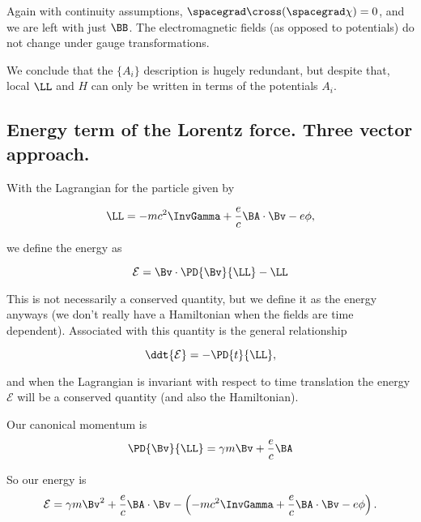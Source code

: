 Again with continuity assumptions, $\spacegrad \cross (\spacegrad \chi) = 0$, and we are left with just $\BB$.  The electromagnetic fields (as opposed to potentials) do not change under gauge transformations.

We conclude that the $\{A_i\}$ description is hugely redundant, but despite that, local $\LL$ and $H$ can only be written in terms of the potentials $A_i$.

\subsection{Energy term of the Lorentz force.  Three vector approach.}

With the Lagrangian for the particle given by

\begin{equation}\label{eqn:relativisticElectrodynamicsL10:130}
\LL = - mc^2 \InvGamma + \frac{e}{c} \BA \cdot \Bv - e \phi,
\end{equation}

we define the energy as 

\begin{equation}\label{eqn:relativisticElectrodynamicsL10:150}
\mathcal{E} = \Bv \cdot \PD{\Bv}{\LL} - \LL
\end{equation}

This is not necessarily a conserved quantity, but we define it as the energy anyways (we don't really have a Hamiltonian when the fields are time dependent).  Associated with this quantity is the general relationship

\begin{equation}\label{eqn:relativisticElectrodynamicsL10:170}
\ddt{\mathcal{E}} = -\PD{t}{\LL},
\end{equation}

and when the Lagrangian is invariant with respect to time translation the energy $\mathcal{E}$ will be a conserved quantity (and also the Hamiltonian).

Our canonical momentum is 
\begin{equation}\label{eqn:relativisticElectrodynamicsL10:190}
\PD{\Bv}{\LL} = \gamma m \Bv + \frac{e}{c} \BA
\end{equation}

So our energy is
\begin{align*}
\mathcal{E} = \gamma m \Bv^2 + \frac{e}{c} \BA \cdot \Bv - \left( - mc^2 \InvGamma + \frac{e}{c} \BA \cdot \Bv - e \phi \right).
\end{align*}

